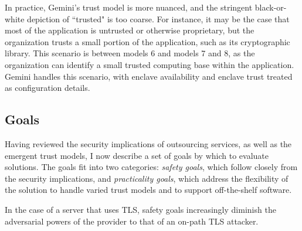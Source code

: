 
In practice, Gemini's trust model is more nuanced, and the stringent
black-or-white depiction of ``trusted" is too coarse.
%
For instance, it may be the case that most of the application is untrusted or
otherwise proprietary, but the organization trusts a small portion of the
application, such as its cryptographic library.
%
This scenario is between models 6 and models 7 and 8, as the organization can
identify a small trusted computing base within the application.
%
Gemini handles this scenario, with enclave availability and enclave trust
treated as configuration details.


\subsection{Goals}

Having reviewed the security implications of outsourcing services, as well as
the emergent trust models, I now describe a set of goals by which to evaluate
solutions.
%
The goals fit into two categories: \emph{safety goals}, which follow closely
from the security implications, and \emph{practicality goals}, which address
the flexibility of the solution to handle varied trust models and to support
off-the-shelf software.

%
In the case of a server that uses TLS, safety goals increasingly diminish the
adversarial powers of the provider to that of an on-path TLS attacker.


